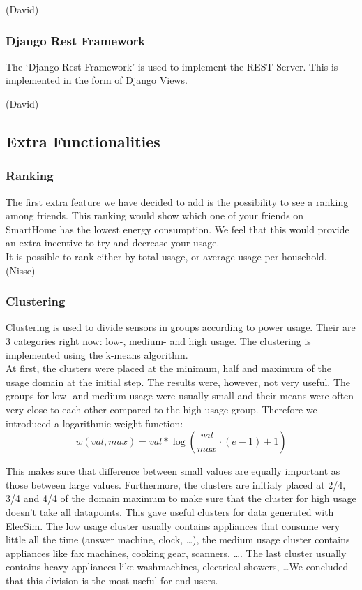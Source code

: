 \documentclass[11pt]{article}
\begin{document}
		(David)
		
	\subsubsection{Django Rest Framework}
		The `Django Rest Framework' is used to implement the REST Server. This is implemented in the form of Django Views.

		(David)	
  \subsection{Extra Functionalities}
	\subsubsection{Ranking}
		The first extra feature we have decided to add is the possibility to see a ranking among friends.
		This ranking would show which one of your friends on SmartHome has the lowest energy consumption.
		We feel that this would provide an extra incentive to try and decrease your usage.\\

		It is possible to rank either by total usage, or average usage per household.\\

		(Nisse)

	\subsubsection{Clustering}
		Clustering is used to divide sensors in groups according to power usage. Their are 3 categories right now: low-, medium- and high usage. The clustering is implemented using the k-means algorithm.\\
		
		At first, the clusters were placed at the minimum, half and maximum of the usage domain at the initial step. The results were, however, not very useful. The groups for low- and medium usage were usually small and their means were often very close to each other compared to the high usage group. Therefore we introduced a logarithmic weight function:
		\[
		w(val, max) = val*\log(\frac{val}{max} \cdot (e - 1) + 1)
		\]
		
		This makes sure that difference between small values are equally important as those between large values. Furthermore, the clusters are initialy placed at 2/4, 3/4 and 4/4 of the domain maximum to make sure that the cluster for high usage doesn't take all datapoints. This gave useful clusters for data generated with ElecSim. The low usage cluster usually contains appliances that consume very little all the time (answer machine, clock, \ldots), the medium usage cluster contains appliances like fax machines, cooking gear, scanners, \ldots. The last cluster usually contains heavy appliances like washmachines, electrical showers, \ldots We concluded that this division is the most useful for end users.
		
\end{document}
